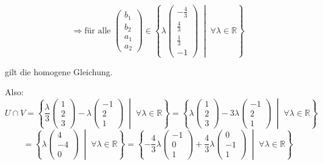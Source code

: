 \documentclass[a4paper,12pt]{article}
\begin{document}
\begin{enumerate}[label=\alph*)]
    \[
        \Rightarrow \text{für alle }
        \begin{pmatrix}b_1\\b_2\\a_1\\a_2\end{pmatrix}
        \in \left\{ \lambda \begin{pmatrix}-\tfrac{4}{3}\\[4pt]\tfrac{4}{3}\\[4pt]\tfrac{1}{3}\\[4pt]-1\end{pmatrix}
        \;\middle|\; \forall\lambda \in \mathbb{R} \right\}
    \]

    gilt die homogene Gleichung.

    Also:
    \[
        U \cap V
        = \left\{ \frac{\lambda}{3}\begin{pmatrix}1\\2\\3\end{pmatrix}
                  - \lambda\begin{pmatrix}-1\\2\\1\end{pmatrix}
          \;\middle|\; \forall\lambda \in \mathbb{R} \right\}
        = \left\{ \lambda\begin{pmatrix}1\\2\\3\end{pmatrix}
                  - 3\lambda\begin{pmatrix}-1\\2\\1\end{pmatrix}
          \;\middle|\; \forall\lambda \in \mathbb{R} \right\}
    \]
    \[
        = \left\{ \lambda \begin{pmatrix}4\\-4\\0\end{pmatrix}
          \;\middle|\; \forall\lambda \in \mathbb{R} \right\}
        = \left\{ -\frac{4}{3}\lambda\begin{pmatrix}-1\\0\\1\end{pmatrix}
                  + \frac{4}{3}\lambda\begin{pmatrix}0\\-1\\1\end{pmatrix}
          \;\middle|\; \forall\lambda \in \mathbb{R} \right\}
    \]


\end{enumerate}
\end{document}
